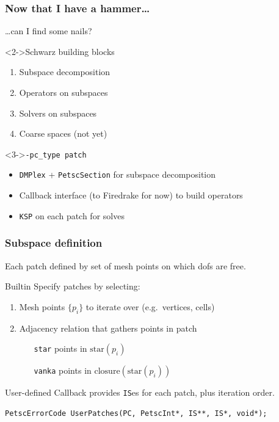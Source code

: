 \documentclass[presentation,aspectratio=43]{beamer}
\begin{document}
\begin{frame}
  \frametitle{Now that I have a hammer\ldots}
  \ldots can I find some nails?

  \begin{block}<2->{Schwarz building blocks}
    \begin{enumerate}
    \item Subspace decomposition
    \item Operators on subspaces
    \item Solvers on subspaces
    \item Coarse spaces (not yet)
    \end{enumerate}
  \end{block}

  \begin{block}<3->{\texttt{-pc\_type patch}}
    \begin{itemize}
    \item \texttt{DMPlex} + \texttt{PetscSection} for subspace decomposition
    \item Callback interface (to Firedrake for now) to build operators
    \item \texttt{KSP} on each patch for solves
    \end{itemize}
  \end{block}
\end{frame}

\begin{frame}[fragile]
  \frametitle{Subspace definition}
  Each patch defined by set of mesh points on which dofs are free.
  \begin{block}{Builtin}
    Specify patches by selecting:
    \begin{enumerate}
    \item Mesh points $\{p_i\}$ to iterate over (e.g.~vertices, cells)
    \item Adjacency relation that gathers points in patch
      \begin{itemize}
      \item[\texttt{star}] points in $\text{star}(p_i)$
      \item[\texttt{vanka}] points in $\text{closure}(\text{star}(p_i))$
      \end{itemize}
    \end{enumerate}
  \end{block}
  \begin{block}{User-defined}
    Callback provides \texttt{IS}es for each patch, plus iteration order.
\begin{verbatim}
PetscErrorCode UserPatches(PC, PetscInt*, IS**, IS*, void*);
\end{verbatim}
  \end{block}
\end{frame}
\end{document}
